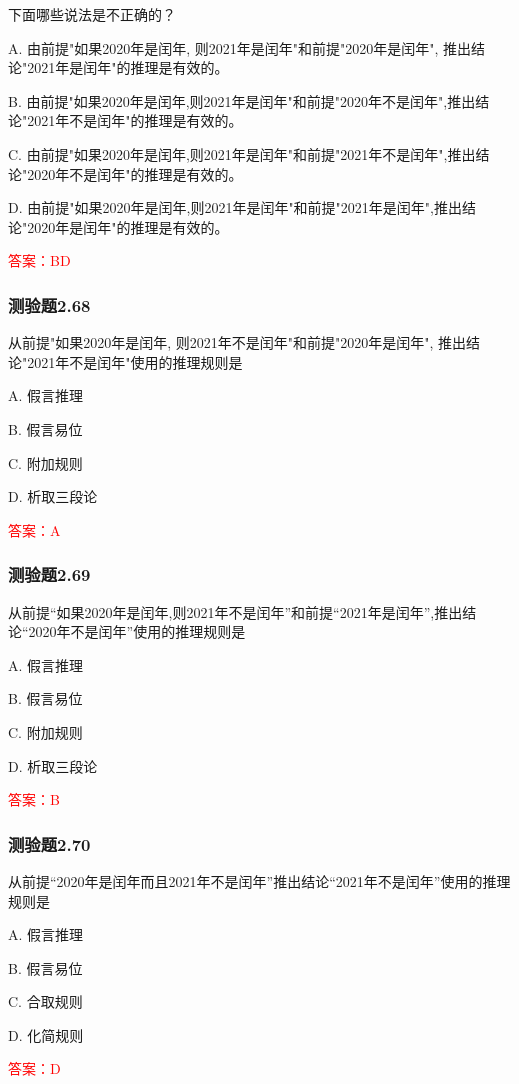 \documentclass[UTF8, heading=true]{ctexart}
\begin{document}
下面哪些说法是不正确的？

A. 由前提"如果2020年是闰年, 则2021年是闰年"和前提"2020年是闰年", 推出结论"2021年是闰年"的推理是有效的。

B. 由前提"如果2020年是闰年,则2021年是闰年"和前提"2020年不是闰年",推出结论"2021年不是闰年"的推理是有效的。

C. 由前提"如果2020年是闰年,则2021年是闰年"和前提"2021年不是闰年",推出结论"2020年不是闰年"的推理是有效的。

D. 由前提"如果2020年是闰年,则2021年是闰年"和前提"2021年是闰年",推出结论"2020年是闰年"的推理是有效的。

\textcolor{red}{答案：BD}

\subsubsection{测验题2.68}

从前提"如果2020年是闰年, 则2021年不是闰年"和前提"2020年是闰年", 推出结论"2021年不是闰年"使用的推理规则是

A. 假言推理

B. 假言易位

C. 附加规则

D. 析取三段论

\textcolor{red}{答案：A}

\subsubsection{测验题2.69}

从前提“如果2020年是闰年,则2021年不是闰年”和前提“2021年是闰年”,推出结论“2020年不是闰年”使用的推理规则是

A. 假言推理

B. 假言易位

C. 附加规则

D. 析取三段论

\textcolor{red}{答案：B}

\subsubsection{测验题2.70}

从前提“2020年是闰年而且2021年不是闰年”推出结论“2021年不是闰年”使用的推理规则是

A. 假言推理

B. 假言易位

C. 合取规则

D. 化简规则

\textcolor{red}{答案：D}
\end{document}
